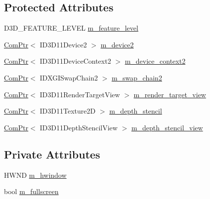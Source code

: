 \subsection*{Protected Attributes}
\begin{DoxyCompactItemize}
\item 
D3\+D\+\_\+\+F\+E\+A\+T\+U\+R\+E\+\_\+\+L\+E\+V\+EL \hyperlink{classmage_1_1_renderer_aa97b108ef58f7d41ddb527f6ba2bfdf9}{m\+\_\+feature\+\_\+level}
\item 
\hyperlink{namespacemage_ae74f374780900893caa5555d1031fd79}{Com\+Ptr}$<$ I\+D3\+D11\+Device2 $>$ \hyperlink{classmage_1_1_renderer_a6c9757faeb4de815f024dc8eac89960c}{m\+\_\+device2}
\item 
\hyperlink{namespacemage_ae74f374780900893caa5555d1031fd79}{Com\+Ptr}$<$ I\+D3\+D11\+Device\+Context2 $>$ \hyperlink{classmage_1_1_renderer_ab8d5eba948922f5ce1116b067e60bee7}{m\+\_\+device\+\_\+context2}
\item 
\hyperlink{namespacemage_ae74f374780900893caa5555d1031fd79}{Com\+Ptr}$<$ I\+D\+X\+G\+I\+Swap\+Chain2 $>$ \hyperlink{classmage_1_1_renderer_a96a55ac9d739141f6ea6692347134eec}{m\+\_\+swap\+\_\+chain2}
\item 
\hyperlink{namespacemage_ae74f374780900893caa5555d1031fd79}{Com\+Ptr}$<$ I\+D3\+D11\+Render\+Target\+View $>$ \hyperlink{classmage_1_1_renderer_a36ed728d4d5f55bc6f248066b2dd0a43}{m\+\_\+render\+\_\+target\+\_\+view}
\item 
\hyperlink{namespacemage_ae74f374780900893caa5555d1031fd79}{Com\+Ptr}$<$ I\+D3\+D11\+Texture2D $>$ \hyperlink{classmage_1_1_renderer_a9f7f61e09d9c788ab4d3190bc0fa58d8}{m\+\_\+depth\+\_\+stencil}
\item 
\hyperlink{namespacemage_ae74f374780900893caa5555d1031fd79}{Com\+Ptr}$<$ I\+D3\+D11\+Depth\+Stencil\+View $>$ \hyperlink{classmage_1_1_renderer_aaeefc175b9a619f95229a3f8464a7924}{m\+\_\+depth\+\_\+stencil\+\_\+view}
\end{DoxyCompactItemize}
\subsection*{Private Attributes}
\begin{DoxyCompactItemize}
\item 
H\+W\+ND \hyperlink{classmage_1_1_renderer_afc314c8b146c3709edfd5349257a8387}{m\+\_\+hwindow}
\item 
bool \hyperlink{classmage_1_1_renderer_a72bb88b17491bd388460afae9d207b0a}{m\+\_\+fullscreen}
\end{DoxyCompactItemize}


